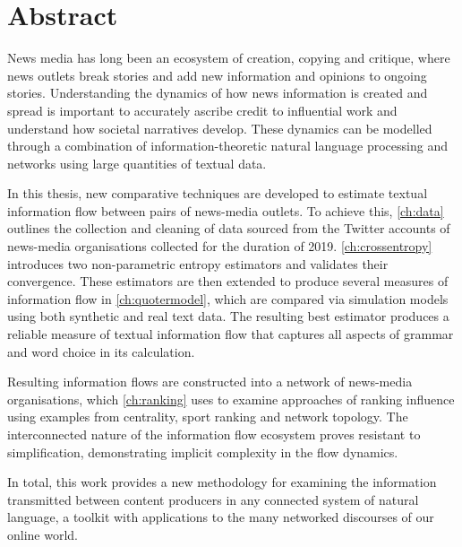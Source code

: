 \chapter{Abstract}
\label{ch:abstract}

News media has long been an ecosystem of creation, copying and critique, where news outlets break stories and add new information and opinions to ongoing stories. Understanding the dynamics of how news information is created and spread is important to accurately ascribe credit to influential work and understand how societal narratives develop. 
These dynamics can be modelled through a combination of information-theoretic natural language processing and networks using large quantities of textual data. 

In this thesis, new comparative techniques are developed to estimate textual information flow between pairs of news-media outlets. To achieve this, \autoref{ch:data} outlines the collection and cleaning of data sourced from the Twitter accounts of news-media organisations collected for the duration of 2019. \autoref{ch:crossentropy} introduces two non-parametric entropy estimators and validates their convergence. These estimators are then extended to produce several measures of information flow in \autoref{ch:quotermodel}, which are compared via simulation models using both synthetic and real text data. The resulting best estimator produces a reliable measure of textual information flow that captures all aspects of grammar and word choice in its calculation. 

Resulting information flows are constructed into a network of news-media organisations, which \autoref{ch:ranking} uses to examine approaches of ranking influence using examples from centrality, sport ranking and network topology. The interconnected nature of the information flow ecosystem proves resistant to simplification, demonstrating implicit complexity in the flow dynamics.

In total, this work provides a new methodology for examining the information transmitted between content producers in any connected system of natural language, a toolkit with applications to the many networked discourses of our online world. 




